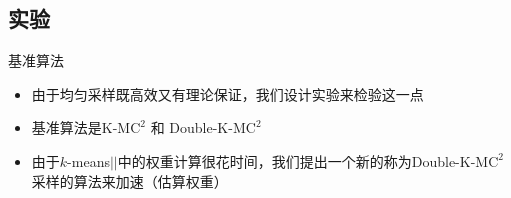 \documentclass[notheorems]{beamer}
\begin{document}
\begin{CJK*}{UTF8}{gbsn}
\subsection{实验}

\begin{frame}{基准算法}
	\begin{itemize}
		\footnotesize
		\item 由于均匀采样既高效又有理论保证，我们设计实验来检验这一点
		\item 基准算法是K-M$\text{C}^2$ \citep{bachem2016approximate}和 Double-K-M$\text{C}^2$
		\item 由于$k$-means\(\vert \vert\)中的权重计算很花时间，我们提出一个新的称为Double-K-M$\text{C}^2$采样的算法来加速（估算权重）
	\end{itemize}
	\begin{center}
	\end{center}
	
\end{frame}


\end{CJK*}
\end{document}
